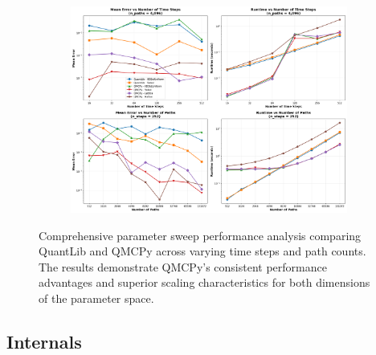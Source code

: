 \begin{figure}[H]
    \centering
    \begin{subfigure}{1\textwidth}
        \centering
        \includegraphics[width=\textwidth]{GBM/images/figure_7.png}
        \label{subfig:performance_steps2}
    \end{subfigure}

    \caption{Comprehensive parameter sweep performance analysis comparing QuantLib and QMCPy across varying time steps and path counts. The results demonstrate QMCPy's consistent performance advantages and superior scaling characteristics for both dimensions of the parameter space.}
    \label{fig:gbm_performance2}
\end{figure}

\subsection{Internals}

